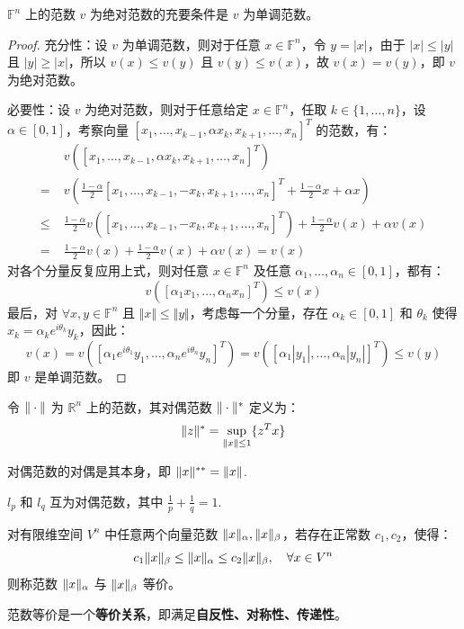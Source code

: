 \begin{theorem}
$\mathbb F^n$ 上的范数 $v$ 为绝对范数的充要条件是 $v$ 为单调范数。
\end{theorem}
\begin{proof}
充分性：设 $v$ 为单调范数，则对于任意 $x\in\mathbb F^n$，令 $y=|x|$，由于 $|x|\leq |y|$ 且 $|y|\geq|x|$，所以 $v(x)\leq v(y)$ 且 $v(y)\leq v(x)$，故 $v(x)=v(y)$，即 $v$ 为绝对范数。

必要性：设 $v$ 为绝对范数，则对于任意给定 $x\in\mathbb F^n$，任取 $k\in\{1,\ldots,n\}$，设 $\alpha\in[0,1]$，考察向量 $[x_1,\ldots,x_{k-1},\alpha x_k,x_{k+1},\ldots,x_n]^T$ 的范数，有：
\begin{align*}
    &v([x_1,\ldots,x_{k-1},\alpha x_k,x_{k+1},\ldots,x_n]^T)\\
    =\;&v\left(\frac{1-\alpha}{2}[x_1,\ldots,x_{k-1},-x_k,x_{k+1},\ldots,x_n]^T+\frac{1-\alpha}{2}x+\alpha x\right)\\
    \leq\;&\frac{1-\alpha}{2}v\left([x_1,\ldots,x_{k-1},-x_k,x_{k+1},\ldots,x_n]^T\right)+\frac{1-\alpha}{2}v(x)+\alpha v(x)\\
    =\;&\frac{1-\alpha}{2}v(x)+\frac{1-\alpha}{2}v(x)+\alpha v(x)=v(x)
\end{align*}
对各个分量反复应用上式，则对任意 $x\in\mathbb F^n$ 及任意 $\alpha_1,\ldots,\alpha_n\in[0,1]$，都有：
\[
    v([\alpha_1x_1,\ldots,\alpha_nx_n]^T)\leq v(x)
\]
最后，对 $\forall x,y\in\mathbb F^n$ 且 $\Vert x\Vert\leq\Vert y\Vert$，考虑每一个分量，存在 $\alpha_k\in[0,1]$ 和 $\theta_k$ 使得 $x_k=\alpha_ke^{i\theta_k}y_k$，因此：
\[
    v(x)=v([\alpha_1e^{i\theta_1}y_1,\ldots,\alpha_ne^{i\theta_n}y_n]^T)=v([\alpha_1|y_1|,\ldots,\alpha_n|y_n|]^T)\leq v(y)
\]
即 $v$ 是单调范数。
\end{proof}

\begin{definition}[对偶范数]
令 $\Vert\cdot\Vert$ 为 $\mathbb R^n$ 上的范数，其对偶范数 $\Vert\cdot\Vert^\ast$ 定义为：
\[
    \Vert z\Vert^\ast=\sup_{\Vert x\Vert\leq 1}\{z^Tx\}
\]
\end{definition}

\begin{property}
对偶范数的对偶是其本身，即 $\Vert x\Vert^{\ast\ast}=\Vert x\Vert$.
\end{property}

\begin{example}
$l_p$ 和 $l_q$ 互为对偶范数，其中 $\frac{1}{p}+\frac{1}{q}=1$.
\end{example}

\begin{definition}[范数等价]
对有限维空间 $V^n$ 中任意两个向量范数 $\Vert x\Vert_\alpha,\Vert x\Vert_\beta$，若存在正常数 $c_1,c_2$，使得：
\[
    c_1\Vert x\Vert_\beta\leq\Vert x\Vert_\alpha\leq c_2\Vert x\Vert_\beta,\quad\forall x\in V^n
\]
则称范数 $\Vert x\Vert_\alpha$ 与 $\Vert x\Vert_\beta$ 等价。
\end{definition}
\begin{com}
范数等价是一个\textbf{等价关系}，即满足\textbf{自反性、对称性、传递性}。
\end{com}

